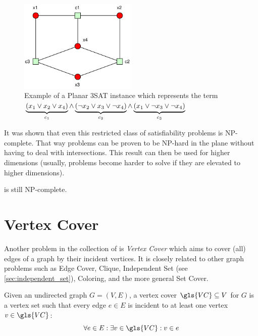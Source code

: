 \begin{figure}[ht]
  \centering
  \includegraphics[width=0.5\textwidth]{img/example_planar_3SAT.pdf}
  \caption{\label{fig:example_planar_3SAT}Example of a Planar 3SAT %
    instance which represents the term \(%
      \protect\underbrace{(x_1 \lor x_2 \lor x_4)}_{c_1}\land%
      \protect\underbrace{(\lnot x_2 \lor x_3 \lor \lnot x_4)}_{c_2}\land%
      \protect\underbrace{(x_1 \lor \lnot x_3 \lor \lnot x_4)}_{c_3}%
    \)}
\end{figure}

It was shown that even this restricted class of satisfiability
problems is NP-complete. That way problems can be proven to be
NP-hard in the plane without having to deal with intersections. This
result can then be used for higher dimensions (usually, problems
become harder to solve if they are elevated to higher dimensions).

\begin{theorem}
   is still NP-complete.~\cite{planar_3SAT}
\end{theorem}

\section{Vertex Cover}
\label{sec:vertex_cover}
Another problem in the collection of \cite{karp_np_complete} is
\emph{Vertex Cover} which aims to cover (all) edges of a graph by
their incident vertices. It is closely related to other graph problems
such as Edge Cover, Clique, Independent Set
(see \cref{sec:independent_set}), Coloring, and the more general Set
Cover.

\begin{definition}
  \label{def:vertex_cover}
  Given an undirected graph \(G=(V,E)\), a vertex cover
  \(\gls{VC} \subseteq V\) for \(G\) is a vertex set such that
  every edge \(e \in E\) is incident to at least one vertex
  \(v \in \gls{VC}\):
  \[ \forall e \in E: \exists v \in \gls{VC}: v \in e \]
\end{definition}

